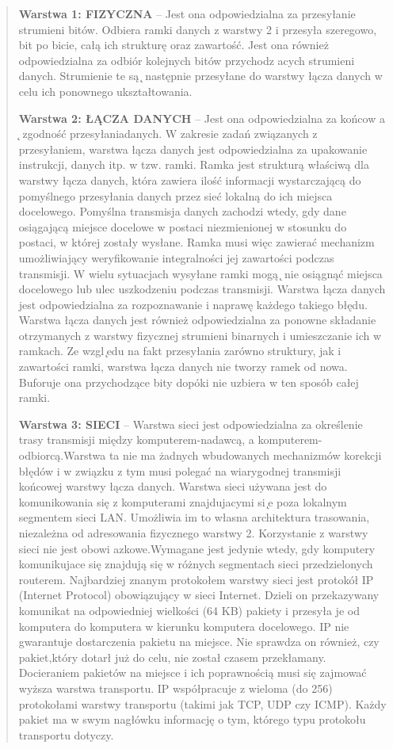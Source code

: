 \documentclass[a4paper,11pt]{article}
\begin{document}
\begin{verse}
\textbf{Warstwa 1: FIZYCZNA} – Jest ona odpowiedzialna za przesyłanie strumieni bitów. Odbiera ramki danych z warstwy 2 i przesyła szeregowo, bit po bicie, całą ich strukturę oraz zawartość. Jest ona również odpowiedzialna za odbiór kolejnych bitów przychodz acych strumieni danych. Strumienie te są  ̨ następnie przesyłane do warstwy łącza danych w celu ich ponownego ukształtowania.


\textbf{Warstwa 2: ŁĄCZA DANYCH} – Jest ona odpowiedzialna za końcow a  ̨ zgodność przesyłaniadanych. W zakresie zadań związanych z przesyłaniem, warstwa łącza danych jest odpowiedzialna za upakowanie instrukcji, danych itp. w tzw. ramki. Ramka jest strukturą właściwą dla warstwy łącza danych, która zawiera ilość informacji wystarczającą do pomyślnego przesyłania danych przez sieć lokalną do ich miejsca docelowego. Pomyślna transmisja danych zachodzi wtedy, gdy dane osiągającą miejsce docelowe w postaci niezmienionej w stosunku do postaci, w której zostały wysłane. Ramka musi więc zawierać mechanizm umożliwiający weryfikowanie integralności jej zawartości podczas transmisji. W wielu sytuacjach wysyłane ramki mogą ̨ nie osiągnąć miejsca docelowego lub ulec uszkodzeniu podczas transmisji. Warstwa łącza danych jest odpowiedzialna za rozpoznawanie i naprawę każdego takiego błędu. Warstwa łącza danych jest również odpowiedzialna za ponowne składanie otrzymanych z warstwy fizycznej strumieni binarnych i umieszczanie ich w ramkach. Ze wzgl ̨edu na fakt przesyłania zarówno struktury, jak i zawartości ramki, warstwa łącza danych nie tworzy ramek od nowa. Buforuje ona przychodzące bity dopóki nie uzbiera w ten sposób całej ramki.

\textbf{Warstwa 3: SIECI} – Warstwa sieci jest odpowiedzialna za określenie trasy transmisji między komputerem-nadawcą, a komputerem-odbiorcą.Warstwa ta nie ma żadnych wbudowanych mechanizmów korekcji błędów i w związku z tym musi polegać na wiarygodnej transmisji końcowej warstwy łącza danych. Warstwa sieci używana jest do komunikowania się z komputerami znajdujacymi
si ̨e poza lokalnym segmentem sieci LAN. Umożliwia im to własna architektura trasowania, niezależna od adresowania fizycznego warstwy 2. Korzystanie z warstwy sieci nie jest obowi azkowe.Wymagane jest jedynie wtedy, gdy komputery komunikujace się znajdują się w różnych segmentach sieci przedzielonych routerem. Najbardziej znanym protokołem warstwy sieci jest protokół IP (Internet Protocol) obowiązujący w sieci Internet. Dzieli on przekazywany komunikat na odpowiedniej wielkości (64 KB) pakiety i przesyła je od komputera do komputera w kierunku komputera docelowego. IP nie gwarantuje dostarczenia pakietu na miejsce. Nie sprawdza on również, czy pakiet,który dotarł już do celu, nie został czasem przekłamany. Docieraniem pakietów na miejsce i ich poprawnością musi się zajmować wyższa warstwa transportu. IP współpracuje z wieloma (do 256) protokołami warstwy transportu (takimi jak TCP, UDP czy ICMP). Każdy pakiet ma w swym nagłówku informację o tym, którego typu protokołu transportu dotyczy.


\end{verse}
\end{document}
